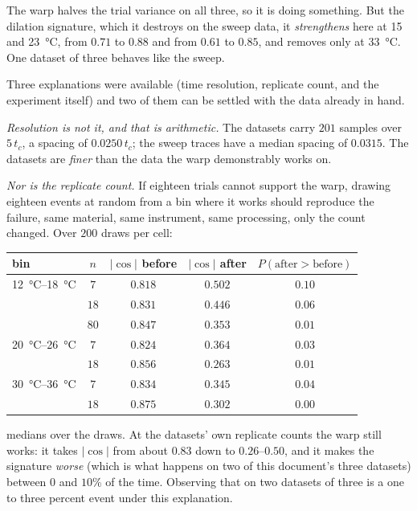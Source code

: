 \documentclass[10pt]{article}
\begin{document}
\noindent The warp halves the trial variance on all three, so it is doing something. But the
dilation signature, which it destroys on the sweep data, it \emph{strengthens} here at
\SI{15}{} and \SI{23}{\celsius}, from $0.71$ to $0.88$ and from $0.61$ to $0.85$, and
removes only at \SI{33}{\celsius}. One dataset of three behaves like the sweep.

Three explanations were available (time resolution, replicate count, and the experiment
itself) and two of them can be settled with the data already in hand.

\emph{Resolution is not it, and that is arithmetic.} The datasets carry $201$ samples over
$5\,t_c$, a spacing of $0.0250\,t_c$; the sweep traces have a median spacing of $0.0315$. The
datasets are \emph{finer} than the data the warp demonstrably works on.

\emph{Nor is the replicate count.} If eighteen trials cannot support the warp, drawing eighteen
events at random from a bin where it works should reproduce the failure, same material, same
instrument, same processing, only the count changed. Over $200$ draws per cell:

\begin{center}
\begin{tabular}{lcccc}
\toprule
bin & $n$ & $\lvert\cos\rvert$ before & $\lvert\cos\rvert$ after & $P(\text{after} > \text{before})$ \\
\midrule
\SIrange{12}{18}{\celsius} & $7$ & $0.818$ & $0.502$ & $0.10$ \\
 & $18$ & $0.831$ & $0.446$ & $0.06$ \\
 & $80$ & $0.847$ & $0.353$ & $0.01$ \\
\SIrange{20}{26}{\celsius} & $7$ & $0.824$ & $0.364$ & $0.03$ \\
 & $18$ & $0.856$ & $0.263$ & $0.01$ \\
\SIrange{30}{36}{\celsius} & $7$ & $0.834$ & $0.345$ & $0.04$ \\
 & $18$ & $0.875$ & $0.302$ & $0.00$ \\
\bottomrule
\end{tabular}
\end{center}

\noindent medians over the draws. At the datasets' own replicate counts the warp still works: it
takes $\lvert\cos\rvert$ from about $0.83$ down to $0.26$--$0.50$, and it makes the signature
\emph{worse} (which is what happens on two of this document's three datasets) between $0$ and
$10\%$ of the time. Observing that on two datasets of three is a one to three percent event under
this explanation.
\end{document}

